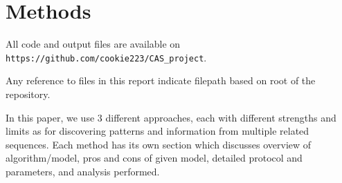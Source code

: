 \documentclass[11pt, oneside]{article}
\begin{document}
%




\section{Methods}

All code and output files are available on \texttt{https://github.com/cookie223/CAS\_project}. 

Any reference to files in this report indicate filepath based on root of the repository. 

In this paper, we use 3 different approaches, each with different strengths and limits as for discovering patterns and information from multiple related sequences. Each method has its own section which discusses overview of algorithm/model, pros and cons of given model, detailed protocol and parameters, and analysis performed. 
\end{document}
